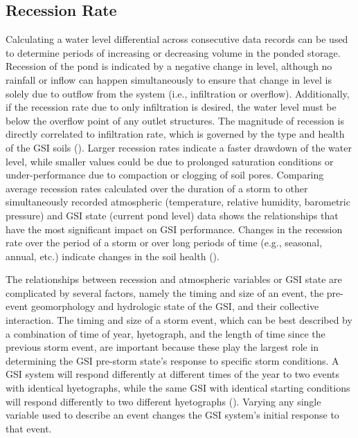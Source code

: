 \subsection{Recession Rate}

Calculating a water level differential across consecutive data records can be used to determine periods of increasing or decreasing volume in the ponded storage.
Recession of the pond is indicated by a negative change in level, although no rainfall or inflow can happen simultaneously to ensure that change in level is solely due to outflow from the system (i.e., infiltration or overflow).
Additionally, if the recession rate due to only infiltration is desired, the water level must be below the overflow point of any outlet structures.
The magnitude of recession is directly correlated to infiltration rate, which is governed by the type and health of the GSI soils (\cite{Gregory2006, Horton1994}).
Larger recession rates indicate a faster drawdown of the water level, while smaller values could be due to prolonged saturation conditions or under-performance due to compaction or clogging of soil pores.
Comparing average recession rates calculated over the duration of a storm to other simultaneously recorded atmospheric (temperature, relative humidity, barometric pressure) and GSI state (current pond level) data shows the relationships that have the most significant impact on GSI performance.
Changes in the recession rate over the period of a storm or over long periods of time (e.g., seasonal, annual, etc.) indicate changes in the soil health (\cite{Jenkins2010,Zukowski2016}).

The relationships between recession and atmospheric variables or GSI state are complicated by several factors, namely the timing and size of an event, the pre-event geomorphology and hydrologic state of the GSI, and their collective interaction.
The timing and size of a storm event, which can be best described by a combination of time of year, hyetograph, and the length of time since the previous storm event, are important because these play the largest role in determining the GSI pre-storm state's response to specific storm conditions.
A GSI system will respond differently at different times of the year to two events with identical hyetographs, while the same GSI with identical starting conditions will respond differently to two different hyetographs (\cite{Braga2007,Joshi2019}).
Varying any single variable used to describe an event changes the GSI system's initial response to that event.

